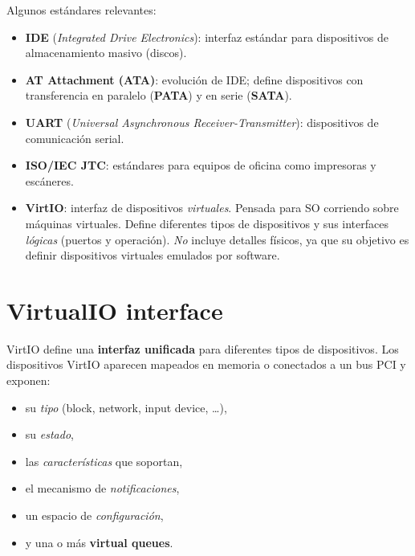 \documentclass[11pt,a4paper]{article}
\begin{document}
Algunos estándares relevantes:

\begin{itemize}[leftmargin=*]
    \item \textbf{IDE} (\emph{Integrated Drive Electronics}): interfaz
        estándar para dispositivos de almacenamiento masivo (discos).
    \item \textbf{AT Attachment (ATA)}: evolución de IDE; define
        dispositivos con transferencia en paralelo (\textbf{PATA}) y
        en serie (\textbf{SATA}).
    \item \textbf{UART} (\emph{Universal Asynchronous
        Receiver-Transmitter}): dispositivos de comunicación serial.
    \item \textbf{ISO/IEC JTC}: estándares para equipos de oficina
        como impresoras y escáneres.
    \item \textbf{VirtIO}: interfaz de dispositivos \emph{virtuales}.
        Pensada para SO corriendo sobre máquinas virtuales. Define
        diferentes tipos de dispositivos y sus interfaces \emph{lógicas}
        (puertos y operación). \emph{No} incluye detalles físicos, ya
        que su objetivo es definir dispositivos virtuales emulados por
        software.
\end{itemize}

\section{VirtualIO interface}

VirtIO define una \textbf{interfaz unificada} para diferentes tipos de
dispositivos. Los dispositivos VirtIO aparecen mapeados en memoria o
conectados a un bus PCI y exponen:

\begin{itemize}[leftmargin=*,nosep]
    \item su \emph{tipo} (block, network, input device, \ldots),
    \item su \emph{estado},
    \item las \emph{características} que soportan,
    \item el mecanismo de \emph{notificaciones},
    \item un espacio de \emph{configuración},
    \item y una o más \textbf{virtual queues}.
\end{itemize}
\end{document}

